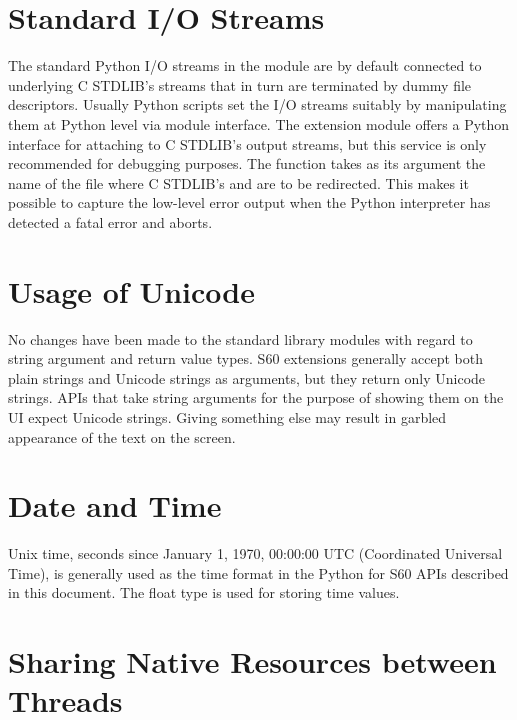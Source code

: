 \section{Standard I/O Streams}
\label{subsec:standard}

The standard Python I/O streams in the  module are by default 
connected to underlying C STDLIB's  streams that in turn are 
terminated by dummy file descriptors. Usually Python scripts set the I/O 
streams suitably by manipulating them at Python level via  
module interface. The  extension module offers a Python 
interface for attaching to C STDLIB's output streams, but this service is 
only recommended for debugging purposes. The  function 
takes as its argument the name of the file where C STDLIB's  
and  are to be redirected. This makes it possible to capture 
the low-level error output when the Python interpreter has detected a fatal 
error and aborts.

\section{Usage of Unicode}
\label{subsec:usage}
No changes have been made to the standard library modules with regard to 
string argument and return value types. S60 extensions generally 
accept both plain strings and Unicode strings as arguments, but they return 
only Unicode strings. APIs that take string arguments for the purpose of 
showing them on the UI expect Unicode strings. Giving something else may 
result in garbled appearance of the text on the screen.

\section{Date and Time}
\label{subsec:datetime}
Unix time, seconds since January 1, 1970, 00:00:00 UTC (Coordinated 
Universal Time), is generally used as the time format in the Python for 
S60 APIs described in this document. The float type is used for 
storing time values.

\section{Sharing Native Resources between Threads}
\label{subsec:sharing}

